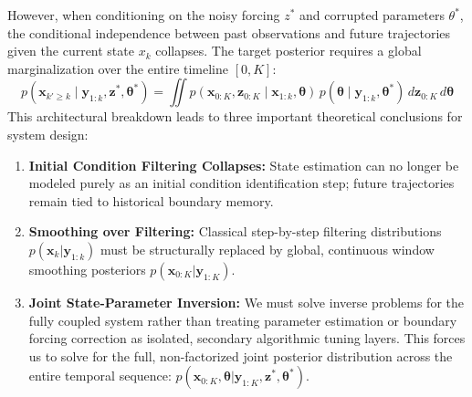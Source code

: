 \documentclass[10pt]{article}
\begin{document}
However, when conditioning on the noisy forcing $z^*$ and corrupted parameters $\theta^*$, the conditional independence between past observations and future trajectories given the current state $x_k$ collapses. The target posterior requires a global marginalization over the entire timeline $[0, K]$:
\begin{equation}
    p\left (\mathbf{x}_{k' \ge k} \mid \mathbf{y}_{1:k}, \mathbf{z}^*, \mathbf{\theta}^*\right) = \iint p(\mathbf{x}_{0:K}, \mathbf{z}_{0:K} \mid \mathbf{x}_{1:k}, \mathbf{\theta}) \, p(\mathbf{\theta} \mid \mathbf{y}_{1:k}, \mathbf{\theta}^*) \, d\mathbf{z}_{0:K} \, d\mathbf{\theta} \label{eq:marginalized_post}
\end{equation}
This architectural breakdown leads to three important theoretical conclusions for system design:
\begin{enumerate}
    \item \textbf{Initial Condition Filtering Collapses:} State estimation can no longer be modeled purely as an initial condition identification step; future trajectories remain tied to historical boundary memory.
    \item \textbf{Smoothing over Filtering:} Classical step-by-step filtering distributions $p(\mathbf{x}_k | \mathbf{y}_{1:k})$ must be structurally replaced by global, continuous window smoothing posteriors $p(\mathbf{x}_{0:K} | \mathbf{y}_{1:K})$.
    \item \textbf{Joint State-Parameter Inversion:} We must solve inverse problems for the fully coupled system rather than treating parameter estimation or boundary forcing correction as isolated, secondary algorithmic tuning layers. This forces us to solve for the full, non-factorized joint posterior distribution across the entire temporal sequence: $p(\mathbf{x}_{0:K}, \mathbf{\theta} | \mathbf{y}_{1:K}, \mathbf{z}^*,\mathbf{\theta}^*)$.
\end{enumerate}
\end{document}

